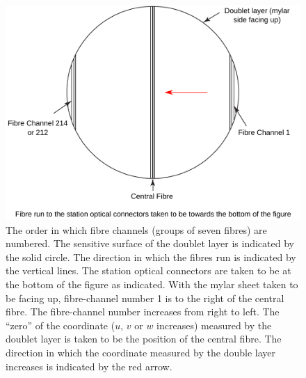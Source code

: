 \begin{figure}
  \begin{center}
    \includegraphics[width=0.85\linewidth]{detectors/tracker/02-Definitions/Figures/fibre-channel-numbering.pdf}
  \end{center}
  \caption{The order in which fibre channels (groups of seven fibres) are numbered. The sensitive surface of the doublet layer is indicated by the solid circle. The direction in which the fibres run is indicated by the vertical lines. The station optical connectors are taken to be at the bottom of the figure as indicated. With the mylar sheet taken to be facing up, fibre-channel number 1 is to the right of the central fibre. The fibre-channel number increases from right to left. The ``zero'' of the coordinate ($u$, $v$ or $w$ increases) measured by the doublet layer is taken to be the position of the central fibre. The direction in which the coordinate measured by the double layer increases is indicated by the red arrow.}
  \label{Fig:FbrChnlNmbrng}
\end{figure}
